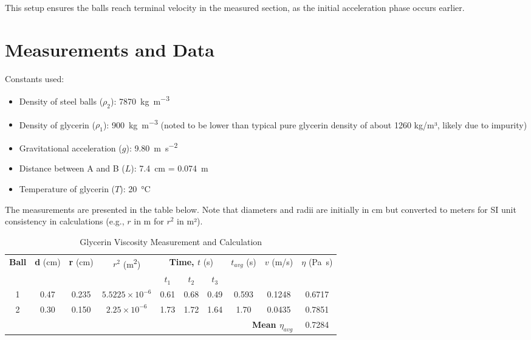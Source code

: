 \documentclass[12pt, a4paper]{article}
\begin{document}
This setup ensures the balls reach terminal velocity in the measured section, as the initial acceleration phase occurs earlier.

\section{Measurements and Data}
Constants used:
\begin{itemize}
	\item Density of steel balls ($\rho_2$): \SI{7870}{\kilo\gram\per\metre\cubed}
	\item Density of glycerin ($\rho_1$): \SI{900}{\kilo\gram\per\metre\cubed} (noted to be lower than typical pure glycerin density of about 1260 kg/m³, likely due to impurity)
	\item Gravitational acceleration ($g$): \SI{9.80}{\metre\per\second\squared}
	\item Distance between A and B ($L$): \SI{7.4}{\centi\metre} = \SI{0.074}{\metre}
	\item Temperature of glycerin ($T$): \SI{20}{\celsius}
\end{itemize}

The measurements are presented in the table below. Note that diameters and radii are initially in cm but converted to meters for SI unit consistency in calculations (e.g., $r$ in m for $r^2$ in m²).

\begin{small}
	\begin{longtable}{|c|c|c|c|c|c|c|c|c|c|}
		\caption{Glycerin Viscosity Measurement and Calculation} \label{tab:olcum} \\
		\hline
		\textbf{Ball} & \textbf{d} (\si{cm}) & \textbf{r} (\si{cm}) & \textbf{$r^2$} (\si{m^2}) & \multicolumn{3}{c|}{\textbf{Time, $t$} (\si{s})} & \textbf{$t_{avg}$} (\si{s}) & \textbf{$v$} (\si{m/s}) & \textbf{$\eta$} (\si{Pa.s}) \\
		\cline{5-7}
		  &        &         &                       & \textbf{$t_1$} & \textbf{$t_2$} & \textbf{$t_3$} &       &        &        \\
		\hline
		1 & 0.47 & 0.235 & $5.5225 \times 10^{-6}$ & 0.61           & 0.68           & 0.49           & 0.593 & 0.1248 & 0.6717 \\
		2 & 0.30 & 0.150 & $2.25 \times 10^{-6}$ & 1.73           & 1.72           & 1.64           & 1.70  & 0.0435 & 0.7851 \\
		\hline
		\multicolumn{9}{|r|}{\textbf{Mean $\eta_{avg}$}} & 0.7284 \\
		\hline
	\end{longtable}
\end{small}
\end{document}
